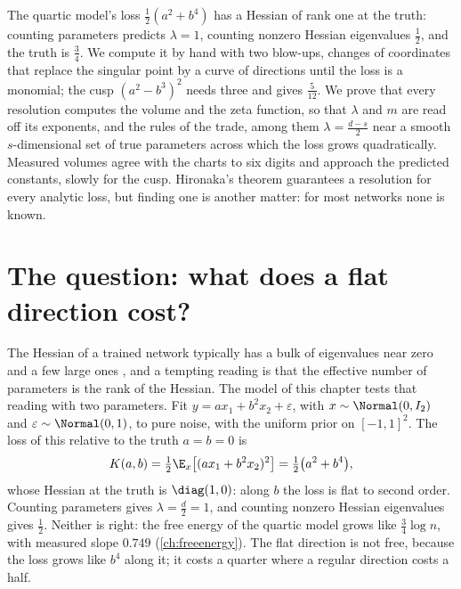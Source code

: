 \begin{refsection}

\begin{chaptersummary}
The quartic model's loss $\frac12(a^2+b^4)$ has a Hessian of rank one at the truth: counting parameters predicts $\lambda=1$, counting nonzero Hessian eigenvalues $\frac12$, and the truth is $\frac34$. We compute it by hand with two blow-ups, changes of coordinates that replace the singular point by a curve of directions until the loss is a monomial; the cusp $(a^2-b^3)^2$ needs three and gives $\frac5{12}$. We prove that every resolution computes the volume and the zeta function, so that $\lambda$ and $m$ are read off its exponents, and the rules of the trade, among them $\lambda=\frac{d-s}2$ near a smooth $s$-dimensional set of true parameters across which the loss grows quadratically. Measured volumes agree with the charts to six digits and approach the predicted constants, slowly for the cusp. Hironaka's theorem guarantees a resolution for every analytic loss, but finding one is another matter: for most networks none is known.
\end{chaptersummary}

\section{The question: what does a flat direction cost?}\label{sec:blowups:question}

The Hessian of a trained network typically has a bulk of eigenvalues near zero and a few large ones \parencite{SagunEtAl2016}, and a tempting reading is that the effective number of parameters is the rank of the Hessian. The model of this chapter tests that reading with two parameters. Fit $y=ax_1+b^2x_2+\varepsilon$, with $x\sim\Normal(0,I_2)$ and $\varepsilon\sim\Normal(0,1)$, to pure noise, with the uniform prior on $[-1,1]^2$. The loss of this  relative to the truth $a=b=0$ is
\[
K(a,b)=\tfrac12\E_x\bigl[(ax_1+b^2x_2)^2\bigr]=\tfrac12\bigl(a^2+b^4\bigr),
\]
whose Hessian at the truth is $\diag(1,0)$: along $b$ the loss is flat to second order. Counting parameters gives $\lambda=\frac d2=1$, and counting nonzero Hessian eigenvalues gives $\frac12$. Neither is right: the free energy of the quartic model grows like $\frac34\log n$, with measured slope $0.749$ (\cref{ch:freeenergy}). The flat direction is not free, because the loss grows like $b^4$ along it; it costs a quarter where a regular direction costs a half.


\end{refsection}
